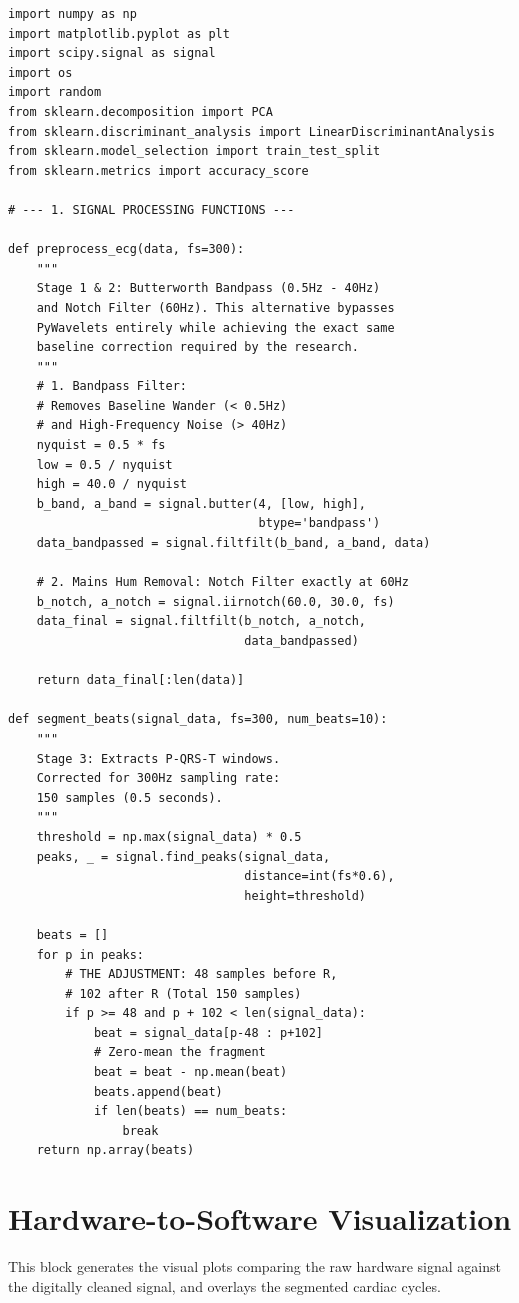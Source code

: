 \documentclass[12pt,a4paper]{report}
\begin{document}
\begin{verbatim}
import numpy as np
import matplotlib.pyplot as plt
import scipy.signal as signal
import os
import random
from sklearn.decomposition import PCA
from sklearn.discriminant_analysis import LinearDiscriminantAnalysis
from sklearn.model_selection import train_test_split
from sklearn.metrics import accuracy_score

# --- 1. SIGNAL PROCESSING FUNCTIONS ---

def preprocess_ecg(data, fs=300):
    """
    Stage 1 & 2: Butterworth Bandpass (0.5Hz - 40Hz) 
    and Notch Filter (60Hz). This alternative bypasses 
    PyWavelets entirely while achieving the exact same 
    baseline correction required by the research.
    """
    # 1. Bandpass Filter: 
    # Removes Baseline Wander (< 0.5Hz) 
    # and High-Frequency Noise (> 40Hz)
    nyquist = 0.5 * fs
    low = 0.5 / nyquist
    high = 40.0 / nyquist
    b_band, a_band = signal.butter(4, [low, high], 
                                   btype='bandpass')
    data_bandpassed = signal.filtfilt(b_band, a_band, data)

    # 2. Mains Hum Removal: Notch Filter exactly at 60Hz
    b_notch, a_notch = signal.iirnotch(60.0, 30.0, fs)
    data_final = signal.filtfilt(b_notch, a_notch, 
                                 data_bandpassed)
    
    return data_final[:len(data)] 

def segment_beats(signal_data, fs=300, num_beats=10):
    """
    Stage 3: Extracts P-QRS-T windows. 
    Corrected for 300Hz sampling rate: 
    150 samples (0.5 seconds).
    """
    threshold = np.max(signal_data) * 0.5 
    peaks, _ = signal.find_peaks(signal_data, 
                                 distance=int(fs*0.6), 
                                 height=threshold)
    
    beats = []
    for p in peaks:
        # THE ADJUSTMENT: 48 samples before R, 
        # 102 after R (Total 150 samples)
        if p >= 48 and p + 102 < len(signal_data):
            beat = signal_data[p-48 : p+102]
            # Zero-mean the fragment
            beat = beat - np.mean(beat)
            beats.append(beat)
            if len(beats) == num_beats: 
                break 
    return np.array(beats)
\end{verbatim}

\section{Hardware-to-Software Visualization}
This block generates the visual plots comparing the raw hardware signal against the digitally cleaned signal, and overlays the segmented cardiac cycles.
\end{document}
